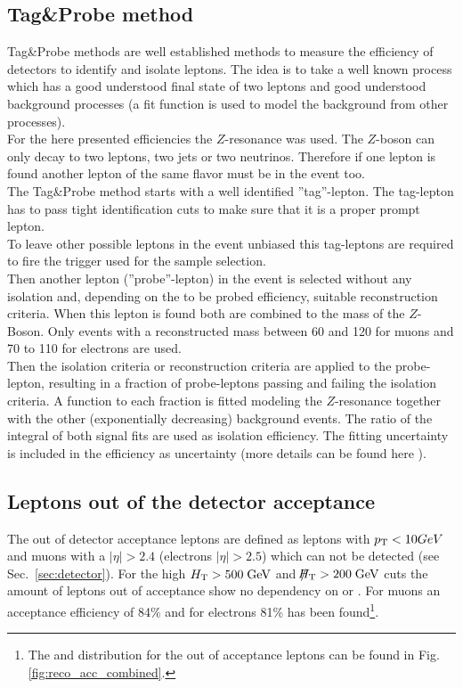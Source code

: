 \subsection{Tag\&Probe method}
\label{sec:tag_probe}
Tag\&Probe methods are well established methods to measure the efficiency of detectors to identify and isolate leptons. The idea is to take a well known process which has a good understood final state of two leptons and good understood background processes (a fit function is used to model the background from other processes).\\
For the here presented efficiencies the $Z$-resonance was used. 
The $Z$-boson can only decay to two leptons, two jets or two neutrinos. Therefore if one lepton is found another lepton of the same flavor must be in the event too.\\
The Tag\&Probe method starts with a well identified ''tag''-lepton. The tag-lepton has to pass tight identification cuts to make sure that it is a proper prompt lepton.\\
To leave other possible leptons in the event unbiased this tag-leptons are required to fire the trigger used for the sample selection.\\
Then another lepton (''probe''-lepton) in the event is selected without any isolation and, depending on the to be probed efficiency, suitable reconstruction criteria. When this lepton is found both are combined to the mass of the $Z$-Boson. Only events with a reconstructed mass between 60 and 120 \gev for muons and 70 to  110 \gev for electrons are used.\\
Then the isolation criteria or reconstruction criteria are applied to the probe-lepton, resulting in a fraction of probe-leptons passing and failing the isolation criteria. A function to each fraction is fitted modeling the $Z$-resonance together with the other (exponentially decreasing) background events. The ratio of the integral of both signal fits are used as isolation efficiency. The fitting uncertainty is included in the efficiency as uncertainty (more details can be found here \cite{bib:phd:jan}). 




\subsection{Leptons out of the detector acceptance}
\label{sec:acceptance}
The out of detector acceptance leptons are defined as leptons with $p_{\text{T}}<10GeV$ and muons with a $|\eta|>2.4$ (electrons $|\eta|>2.5$) which can not be detected (see Sec.~\ref{sec:detector}). %
For the high $H_{\text{T}}>500 \;\text{Ge}\kern-0.06667em\text{V}$ and $\slash\mkern-12mu{H}_{\text{T}}>200 \;\text{Ge}\kern-0.06667em\text{V}$ cuts the amount of leptons out of acceptance show no dependency on \HT or \MHT. For muons an acceptance efficiency of 84\% and for electrons 81\% has been found\footnote{The \HT and \MHT distribution for the out of acceptance leptons can be found in  Fig.\ref{fig:reco_acc_combined}.}. 

